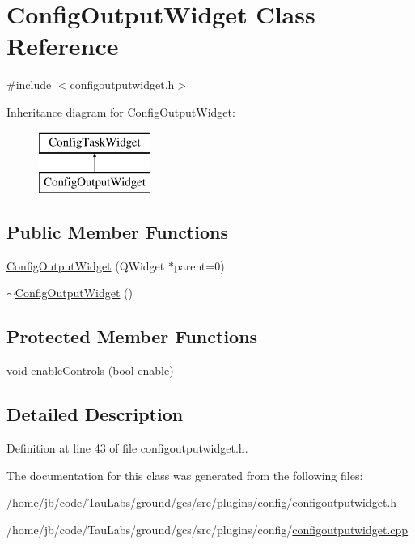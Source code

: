 \hypertarget{class_config_output_widget}{\section{\-Config\-Output\-Widget \-Class \-Reference}
\label{class_config_output_widget}
}


{\ttfamily \#include $<$configoutputwidget.\-h$>$}

\-Inheritance diagram for \-Config\-Output\-Widget\-:\begin{figure}[H]
\begin{center}
\leavevmode
\includegraphics[height=2.000000cm]{class_config_output_widget}
\end{center}
\end{figure}
\subsection*{\-Public \-Member \-Functions}
\begin{DoxyCompactItemize}
\item 
\hyperlink{group___config_plugin_gae97fadc2217af00fbdcd40904dffdfcd}{\-Config\-Output\-Widget} (\-Q\-Widget $\ast$parent=0)
\item 
\hyperlink{group___config_plugin_ga583ddecf4689ec9d73a39ac36d47beb5}{$\sim$\-Config\-Output\-Widget} ()
\end{DoxyCompactItemize}
\subsection*{\-Protected \-Member \-Functions}
\begin{DoxyCompactItemize}
\item 
\hyperlink{group___u_a_v_objects_plugin_ga444cf2ff3f0ecbe028adce838d373f5c}{void} \hyperlink{group___config_plugin_ga8c6d4684111bd4a10d4940a803faf852}{enable\-Controls} (bool enable)
\end{DoxyCompactItemize}


\subsection{\-Detailed \-Description}


\-Definition at line 43 of file configoutputwidget.\-h.



\-The documentation for this class was generated from the following files\-:\begin{DoxyCompactItemize}
\item 
/home/jb/code/\-Tau\-Labs/ground/gcs/src/plugins/config/\hyperlink{configoutputwidget_8h}{configoutputwidget.\-h}\item 
/home/jb/code/\-Tau\-Labs/ground/gcs/src/plugins/config/\hyperlink{configoutputwidget_8cpp}{configoutputwidget.\-cpp}\end{DoxyCompactItemize}

